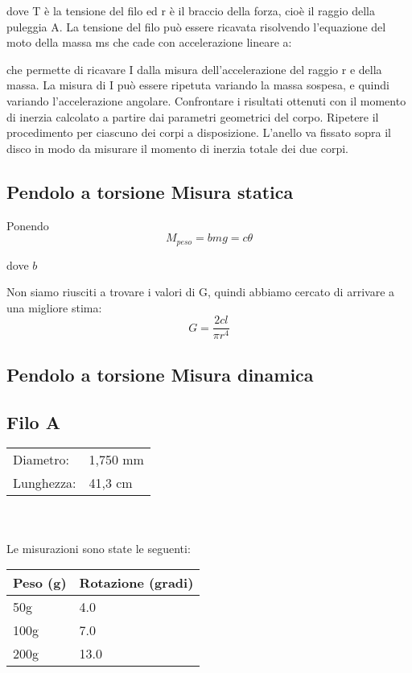 \documentclass[a4paper,10pt]{report}
\begin{document}
dove T è la tensione del filo ed r è il braccio della forza, cioè il raggio della puleggia A. La tensione del filo può essere ricavata risolvendo l’equazione del moto della massa ms che cade con accelerazione lineare a:

che permette di ricavare I dalla misura dell’accelerazione  del raggio r e della massa. La misura di I può essere ripetuta variando la massa sospesa, e quindi variando l'accelerazione angolare. Confrontare i risultati ottenuti con il momento di inerzia calcolato a partire dai parametri geometrici del corpo.
Ripetere il procedimento per ciascuno dei corpi a disposizione. L’anello va fissato sopra il disco in modo da misurare il momento di inerzia totale dei due corpi.

\subsection{Pendolo a torsione Misura statica}

Ponendo
$$ M_{peso} = bmg = c\theta $$

dove $b$ 

Non siamo riusciti a trovare i valori di G, quindi abbiamo cercato di arrivare a una migliore stima:
$$ G = \frac{2cl}{\pi r^4} $$

\subsection{Pendolo a torsione Misura dinamica}

\subsection{Filo A}
\begin{tabular}{ll}
Diametro: & 1,750 mm\\
Lunghezza: & 41,3 cm\\
\end{tabular}
\\ \\
Le misurazioni sono state le seguenti:
\begin{center}
\begin{tabular}{|l|l|}
\toprule
Peso (g) & Rotazione (gradi)\\
\midrule
50g & 4.0 \\
100g & 7.0 \\
200g & 13.0 \\
\bottomrule
\end{tabular}
\end{center}
\end{document}
